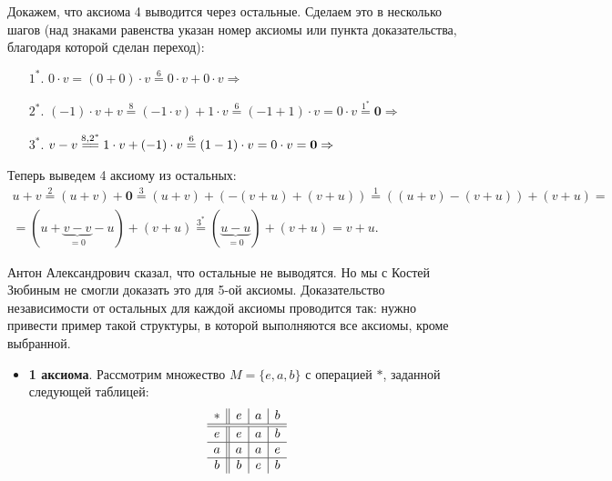 \begin{orangebox}
    Докажем, что аксиома 4 выводится через остальные. Сделаем это в несколько шагов (над знаками равенства указан номер аксиомы или пункта доказательства, благодаря которой сделан переход):
    \begin{enumerate}
        \item[$1^\ast$.] $0 \cdot v = (0 + 0) \cdot v \overset{6}{=} 0 \cdot v + 0 \cdot v \Rightarrow $ 
        \item[$2^\ast$.] $(-1) \cdot v + v \overset{8}{=} (-1 \cdot v) + 1 \cdot v \overset{6}{=} (-1 + 1) \cdot v = 0 \cdot v \overset{1^\ast}{=} \boldsymbol{0} \Rightarrow$ 
        \item[$3^\ast$.] $v - v \overset{8, 2^\ast}{=\joinrel=} 1 \cdot v + (-1) \cdot v \overset{6}{=} (1 - 1) \cdot v = 0 \cdot v = \boldsymbol{0} \Rightarrow$ 
    \end{enumerate}

    Теперь выведем 4 аксиому из остальных:
    $$
    \begin{array}{c}\displaystyle
        u + v \overset{2}{=} (u + v) + \boldsymbol{0} \overset{3}{=} (u + v) + (-(v + u) + (v + u)) \overset{1}{=} ((u + v) - (v + u)) + (v + u) = {}\\\displaystyle {} = (u + \underbrace{v - v}_{{} = 0} - u) + (v + u) \overset{3^\ast}{=} (\underbrace{u - u}_{{} = 0}) + (v + u) = v + u.
    \end{array}
    $$

    Антон Александрович сказал, что остальные не выводятся. Но мы с Костей Зюбиным не смогли доказать это для 5-ой аксиомы. Доказательство независимости от остальных для каждой аксиомы проводится так: нужно привести пример такой структуры, в которой выполняются все аксиомы, кроме выбранной.
    \begin{itemize}
        \item \textbf{1 аксиома}. Рассмотрим множество $M = \{e, a, b\}$ с операцией $\ast$, заданной следующей таблицей:
            $$
            \begin{array}{c || c | c | c}
                \ast & e & a & b\\
                \hline\hline
                e & e & a & b\\
                \hline
                a & a & a & e\\
                \hline
                b & b & e & b
            \end{array}
            $$


\end{itemize}
\end{orangebox}
